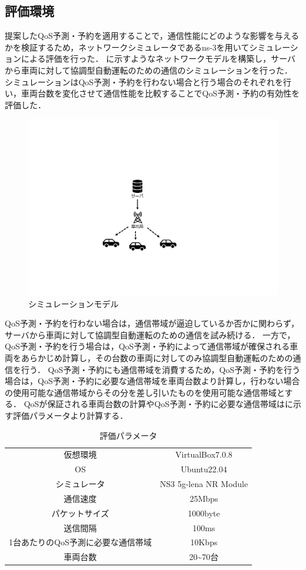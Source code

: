 \documentclass[a4paper,11pt,uplatex]{ujreport}
\begin{document}
\subsection{評価環境}
\label{評価環境}

  提案したQoS予測・予約を適用することで，通信性能にどのような影響を与えるかを検証するため，ネットワークシミュレータであるns-3\cite{ns-3}を用いてシミュレーションによる評価を行った．
  に示すようなネットワークモデルを構築し，サーバから車両に対して協調型自動運転のための通信のシミュレーションを行った．
  シミュレーションはQoS予測・予約を行わない場合と行う場合のそれぞれを行い，車両台数を変化させて通信性能を比較することでQoS予測・予約の有効性を評価した．\par

  \begin{figure}[tb]
    \centering
    \includegraphics[width=0.60\linewidth]{img/シミュレーションモデル2.pdf}
    \caption{シミュレーションモデル}
    \label{fig:model}
  \end{figure}

  QoS予測・予約を行わない場合は，通信帯域が逼迫しているか否かに関わらず，サーバから車両に対して協調型自動運転のための通信を試み続ける．
  一方で，QoS予測・予約を行う場合は，QoS予測・予約によって通信帯域が確保される車両をあらかじめ計算し，その台数の車両に対してのみ協調型自動運転のための通信を行う．
  QoS予測・予約にも通信帯域を消費するため，QoS予測・予約を行う場合は，QoS予測・予約に必要な通信帯域を車両台数より計算し，行わない場合の使用可能な通信帯域からその分を差し引いたものを使用可能な通信帯域とする．
  QoSが保証される車両台数の計算やQoS予測・予約に必要な通信帯域はに示す評価パラメータより計算する．\par
  
  \begin{table}[tb]
    \centering
    \caption{評価パラメータ}
    \label{tab:parameter}
    \begin{tabular}{cc}
      \hline
      仮想環境 & VirtualBox7.0.8\\
      OS & Ubuntu22.04\\
      シミュレータ & NS3 5g-lena NR Module\\
      通信速度 & 25Mbps\\
      パケットサイズ & 1000byte\\
      送信間隔 & 100ms\\
      1台あたりのQoS予測に必要な通信帯域 & 10Kbps\\
      車両台数 & 20\textasciitilde70台\\
      \hline
    \end{tabular}
  \end{table}
\end{document}
